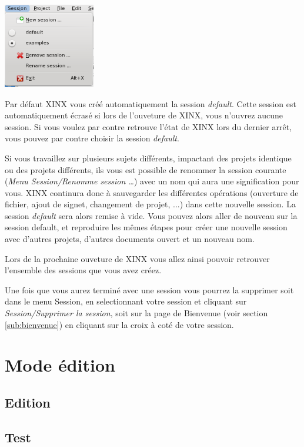\documentclass[a4paper,10pt,twoside]{book}
\begin{document}
\begin{center}
 \includegraphics[width=0.30\textwidth]{./xinxsessionmenu.png}
\end{center}

Par défaut XINX vous créé automatiquement la session \emph{default}. Cette session est automatiquement écrasé si lors de l'ouveture de XINX, vous n'ouvrez aucune session.  Si vous voulez par contre retrouve l'état de XINX lors du dernier arrêt, vous pouvez par contre choisir la session \emph{default}.

Si vous travaillez sur plusieurs sujets différents, impactant des projets identique ou des projets différents, ils vous est possible de renommer la session courante (\emph{Menu Session/Renomme session \dots}) avec un nom qui aura une signification pour vous. XINX continura donc à sauvegarder les différentes opérations (ouverture de fichier, ajout de signet, changement de projet, ...) dans cette nouvelle session. La session \emph{default} sera alors remise à vide.
Vous pouvez alors aller de nouveau sur la session default, et reproduire les mêmes étapes pour créer une nouvelle session avec d'autres projets, d'autres documents ouvert et un nouveau nom.

Lors de la prochaine ouveture de XINX vous allez ainsi pouvoir retrouver l'ensemble des sessions que vous avez créez.

Une fois que vous aurez terminé avec une session vous pourrez la supprimer soit dans le menu Session, en selectionnant votre session et cliquant sur \emph{Session/Supprimer la session}, soit sur la page de Bienvenue (voir section \ref{sub:bienvenue}) en cliquant sur la croix à coté de votre session.

\section{Mode édition}

\subsection{Edition}

\subsection{Test}
\end{document}
